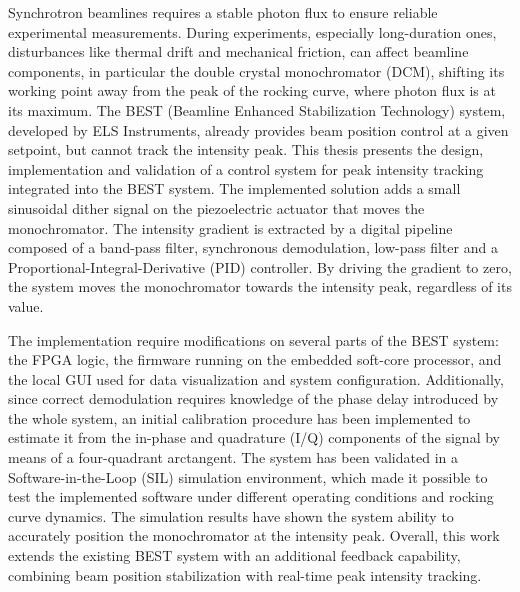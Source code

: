 Synchrotron beamlines requires a stable photon flux to ensure reliable experimental measurements.
During experiments, especially long-duration ones, disturbances like thermal drift and mechanical friction, 
can affect beamline components, in particular the double crystal monochromator (DCM), shifting its working point away from the peak of the rocking curve, where photon flux is at its maximum.
The BEST (Beamline Enhanced Stabilization Technology) system, developed by ELS Instruments, already provides beam position control at a given setpoint, but cannot track the intensity peak.
This thesis presents the design, implementation and validation of a control system for peak intensity tracking integrated into the BEST system.
The implemented solution adds a small sinusoidal dither signal on the piezoelectric actuator that moves the monochromator.
The intensity gradient is extracted by a digital pipeline composed of a band-pass filter, synchronous demodulation, low-pass filter and a Proportional-Integral-Derivative (PID) controller.
By driving the gradient to zero, the system moves the monochromator towards the intensity peak, regardless of its value.

The implementation require modifications on several parts of the BEST system: the FPGA logic, the firmware running on the embedded soft-core processor, and the local GUI used for data visualization and system configuration.
Additionally, since correct demodulation requires knowledge of the phase delay introduced by the whole system, an initial calibration procedure has been implemented to estimate it from the in-phase and quadrature (I/Q) components of the signal by means of a four-quadrant arctangent.
The system has been validated in a Software-in-the-Loop (SIL) simulation environment, which made it possible to test the implemented software under different operating conditions and rocking curve dynamics.
The simulation results have shown the system ability to accurately position the monochromator at the intensity peak.
Overall, this work extends the existing BEST system with an additional feedback capability, combining beam position stabilization with real-time peak intensity tracking.